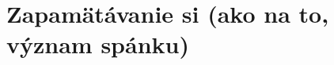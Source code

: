 \documentclass[11pt,a4paper%
]{article}
\begin{document}
\section{Zapamätávanie si (ako na to, význam spánku)}
%
%
%
%
\end{document}
